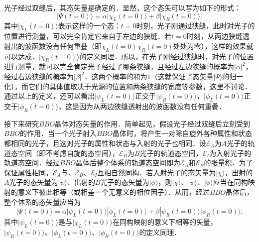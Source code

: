 光子经过双缝后，其态矢量是确定的．显然，这个态矢可以写为如下的形式：
\begin{equation}
|\Psi(t=0)\rangle =\alpha|\chi_L(t=0)\rangle+\beta|\chi_R(t=0)\rangle.
\end{equation}
其中$|\chi_L(t=0)\rangle$表示这样的一个态：$t=0$时刻，光子刚通过狭缝，此时对光子的位置进行测量，可以完全肯定它来自于左边的狭缝．若$t=0$时刻，从两边狭缝透射出的波函数没有任何重叠（即$\chi_L(t=0)\chi_R(t=0)$处处为零），这样的效果就可以达成．$|\chi_R(t=0)\rangle$的定义同理．所以，在光子刚经过狭缝时，对光子的位置进行测量，就可以完全肯定光子经过了哪条狭缝，且经过左边狭缝的概率为$|\alpha|^2$，经过右边狭缝的概率为$|\beta|^2$．这两个概率的和为$1$（这就保证了态矢量$|\Psi\rangle$的归一化），而它们的具体值取决于光源的位置和两条狭缝的宽度等参数，这里不讨论．通过以上的定义，还可以看出$|\psi_L(t=0)\rangle$正交于$|\psi_R(t=0)\rangle$，$|\phi_L(t=0)\rangle$正交于$|\phi_R(t=0)\rangle$，这是因为从两边狭缝透射出的波函数没有任何重叠．

接下来研究$BBO$晶体对态矢量的作用．简单起见，假设光子经过双缝后立刻受到$BBO$的作用．当一个光子射入$BBO$晶体时，将产生一对除自旋外各种属性和状态都相同的光子，且这对光子的属性和状态与入射的光子也相同．设$\mathscr{E}_A$为$A$光子的轨道态空间（即不考虑自旋的态空间），$\mathscr{E}_B$为$B$光子的轨道态空间，$\mathscr{E}_I$为入射光子的轨道态空间．经过$BBO$晶体后整个体系的轨道态空间即为$\mathscr{E}_A$和$\mathscr{E}_B$的张量积．为了保证属性相同，$\mathscr{E}_A$与、$\mathscr{E}_B$、$\mathscr{E}_I$互相自然同构．若入射光子的态矢量为$|\chi\rangle$，出射的$A$光子的态矢量为$|\psi\rangle$、出射的$B$光子的态矢量为$|\phi\rangle$，则$|\chi\rangle$、$|\psi\rangle$、$|\phi\rangle$应当在同构映射的意义下彼此相等（或相差一个无意义的相位因子）．从而，经过$BBO$晶体后，整个体系的态矢量应当为
\begin{equation}
|\Psi(t=0)\rangle =\alpha|\psi_L(t=0)\rangle|\phi_L(t=0)\rangle+\beta|\psi_R(t=0)\rangle|\phi_R(t=0)\rangle.
\end{equation}
其中$|\psi_L(t=0)\rangle$是与$|\chi_L(t=0)\rangle$在同构映射的意义下相等的矢量，$|\psi_R(t=0)\rangle$、$|\phi_L(t=0)\rangle$、$|\phi_R(t=0)\rangle$的定义同理．

